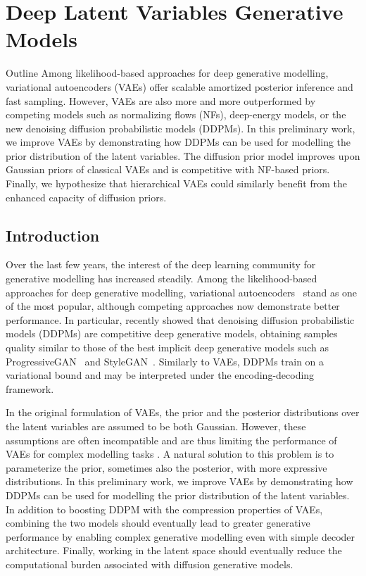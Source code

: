\chapter{Deep Latent Variables Generative Models}\label{ch:03}

\begin{remark}{Outline}
Among likelihood-based approaches for deep generative modelling, variational autoencoders (VAEs) offer scalable amortized posterior inference and fast sampling. However, VAEs are also more and more outperformed by competing models such as normalizing flows (NFs), deep-energy models, or the new denoising diffusion probabilistic models (DDPMs).
In this preliminary work, we improve VAEs by demonstrating how DDPMs can be used for modelling the prior distribution of the latent variables. The diffusion prior model improves upon Gaussian priors of classical VAEs and is competitive with NF-based priors.
Finally, we hypothesize that hierarchical VAEs could similarly benefit from the enhanced capacity of diffusion priors.
\end{remark}

\section{Introduction}
Over the last few years, the interest of the deep learning community for generative modelling has increased steadily.
Among the likelihood-based approaches for deep generative modelling, variational autoencoders~\citep[VAEs]{kingma_auto-encoding_2013} stand as one of the most popular, although competing approaches now demonstrate better performance.
In particular, \citet{ho_denoising_2020,nichol_improved_2021,dhariwal2021diffusion} recently showed that denoising diffusion probabilistic models (DDPMs) are competitive deep generative models, obtaining samples quality similar to those of the best implicit deep generative models such as ProgressiveGAN~\citep{PGANs} and StyleGAN~\citep{karras2019style}.
Similarly to VAEs, DDPMs train on a variational bound and may be interpreted under the encoding-decoding framework.

In the original formulation of VAEs, the prior and the posterior distributions over the latent variables are assumed to be both Gaussian.
However, these assumptions are often incompatible and are thus limiting the performance of VAEs for complex modelling tasks \citep{tomczak_vae_2018, chen_isolating_2018}.
A natural solution to this problem is to parameterize the prior, sometimes also the posterior, with more expressive distributions. In this preliminary work, we improve VAEs by demonstrating how DDPMs can be used for modelling the prior distribution of the latent variables. In addition to boosting DDPM with the compression properties of VAEs, combining the two models should eventually lead to greater generative performance by enabling complex generative modelling even with simple decoder architecture. Finally, working in the latent space should eventually reduce the computational burden associated with diffusion generative models.

